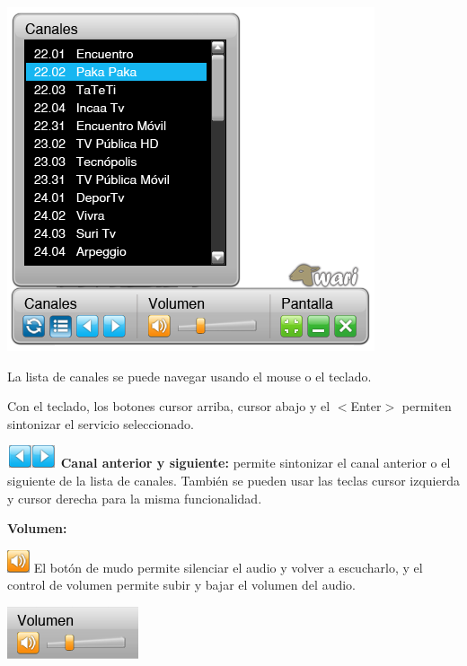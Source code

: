 \documentclass{article}
\begin{document}
\centerline{\includegraphics[scale=0.75,keepaspectratio=true]{ListaCanales}}

\vspace{0.5cm}
La lista de canales se puede navegar usando el mouse o el teclado.

Con el teclado, los botones cursor arriba, cursor abajo y el $<$Enter$>$ permiten sintonizar el servicio seleccionado.

\vspace{0.5cm}
\includegraphics[scale=0.75,keepaspectratio=true]{navAntSig} \textbf{Canal anterior y siguiente:} permite sintonizar el canal anterior o el siguiente de la lista de canales. También se pueden usar las teclas cursor izquierda y cursor derecha para la misma funcionalidad.

\vspace{0.5cm}
\textbf{Volumen:}

\vspace{0.5cm}
\includegraphics[scale=0.75,keepaspectratio=true]{BtnVolumen} El botón de mudo permite silenciar el audio y volver a escucharlo, y el control de volumen permite subir y bajar el volumen del audio.
	
\vspace{0.5cm}	
\centerline{\includegraphics[scale=0.75,keepaspectratio=true]{BtnVol}}
\end{document}
